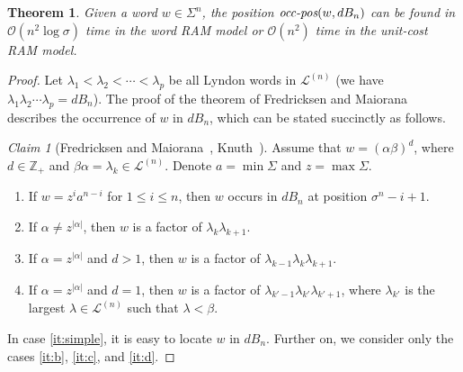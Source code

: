 \documentclass{article}
\newcommand{\Oh}{\mathcal{O}}
\newcommand{\integ}{\mathbb{Z}}
\newcommand{\dB}{dB}
\newcommand{\occ}{\mbox{\it occ-pos}}
\renewcommand{\L}{{\mathcal{L}}}
\newtheorem{theorem}{Theorem}
\theoremstyle{definition}
\theoremstyle{remark}
\newtheorem*{claim}{Claim}
\begin{document}
\begin{theorem}\label{thm:decoding}
  Given a word $w \in \Sigma^n$, the position $\occ(w,\dB_n)$ can be found in $\Oh(n^2\log\sigma)$ time in the word RAM model or $\Oh(n^2)$ time in the unit-cost RAM model.
\end{theorem}
\begin{proof}
  Let $\lambda_1 < \lambda_2 < \cdots < \lambda_p$ be all Lyndon words in $\L^{(n)}$
  (we have $\lambda_1 \lambda_2 \cdots \lambda_p = \dB_n$).
  The proof of the theorem of Fredricksen and Maiorana \cite{fredricksen1978necklaces,Knuth}
  describes the occurrence of $w$ in $\dB_n$, which can be stated succinctly as follows.
  \begin{claim}[Fredricksen and Maiorana~\cite{fredricksen1978necklaces}, Knuth~\cite{Knuth}]
       Assume that $w=(\alpha\beta)^d$, where $d \in \integ_+$ and $\beta\alpha = \lambda_k \in \L^{(n)}$.
     Denote $a = \min\Sigma$ and $z = \max\Sigma$.  
  \begin{enumerate}[label={(\alph*)}] 
    \item\label{it:simple} If $w=z^ia^{n-i}$ for $1 \le i\le n$, then $w$ occurs in $\dB_n$ at position $\sigma^n-i+1$.
    \item\label{it:b} If $\alpha \ne z^{|\alpha|}$, then $w$ is a factor of $\lambda_k\lambda_{k+1}$.
    \item\label{it:c} If $\alpha = z^{|\alpha|}$ and $d>1$, then $w$ is a factor of $\lambda_{k-1}\lambda_k\lambda_{k+1}$.
    \item\label{it:d} If $\alpha = z^{|\alpha|}$ and $d=1$, then $w$ is a factor of $\lambda_{k'-1}\lambda_{k'}\lambda_{k'+1}$,
    where $\lambda_{k'}$ is the largest $\lambda \in \L^{(n)}$ such that $\lambda < \beta$.
  \end{enumerate}
  \end{claim}
  In case \ref{it:simple}, it is easy to locate $w$ in $\dB_n$.
  Further on, we consider only the cases \ref{it:b}, \ref{it:c}, and \ref{it:d}.


\end{proof}
\end{document}
